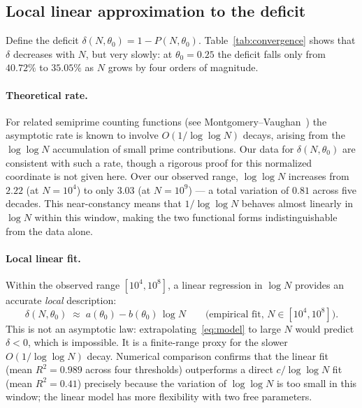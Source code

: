 \documentclass[11pt]{article}
\theoremstyle{definition}
\begin{document}
\subsection{Local linear approximation to the deficit}
\label{sec:linear}

Define the deficit \(\delta(N,\theta_0) = 1 - P(N,\theta_0)\).
Table~\ref{tab:convergence} shows that \(\delta\) decreases with \(N\), but very
slowly: at \(\theta_0 = 0.25\) the deficit falls only from \(40.72\%\) to \(35.05\%\)
as \(N\) grows by four orders of magnitude.

\paragraph{Theoretical rate.}
For related semiprime counting functions (see Montgomery--Vaughan~\cite{montgomery2007})
the asymptotic rate is known to involve \(O(1/\!\log\log N)\) decays,
arising from the \(\log\log N\) accumulation of small prime contributions.
Our data for \(\delta(N,\theta_0)\) are consistent with such a rate, though a rigorous
proof for this normalized coordinate is not given here.
Over our observed range, \(\log\log N\) increases from \(2.22\) (at \(N = 10^4\)) to
only \(3.03\) (at \(N = 10^9\)) --- a total variation of \(0.81\) across five decades.
This near-constancy means that \(1/\!\log\log N\) behaves almost linearly in \(\log N\)
within this window, making the two functional forms indistinguishable from the data alone.

\paragraph{Local linear fit.}
Within the observed range \([10^4, 10^8]\), a linear regression in \(\log N\) provides
an accurate \emph{local} description:
\begin{equation}\label{eq:model}
  \delta(N,\theta_0) \;\approx\; a(\theta_0) - b(\theta_0)\,\log N
  \qquad \text{(empirical fit, } N \in [10^4, 10^8]\text{)}.
\end{equation}
This is not an asymptotic law: extrapolating~\eqref{eq:model} to large \(N\) would
predict \(\delta < 0\), which is impossible.  It is a finite-range proxy for the
slower \(O(1/\!\log\log N)\) decay.  Numerical comparison confirms that the linear fit
(mean \(R^2 = 0.989\) across four thresholds) outperforms a direct \(c/\!\log\log N\)
fit (mean \(R^2 = 0.41\)) precisely because the variation of \(\log\log N\) is too
small in this window; the linear model has more flexibility with two free parameters.
\end{document}
